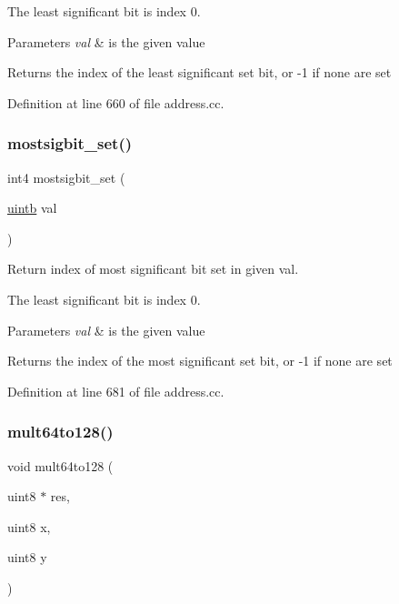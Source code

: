 The least significant bit is index 0. 
\begin{DoxyParams}{Parameters}
{\em val} & is the given value \\
\hline
\end{DoxyParams}
\begin{DoxyReturn}{Returns}
the index of the least significant set bit, or -\/1 if none are set 
\end{DoxyReturn}


Definition at line 660 of file address.\+cc.

\mbox{\label{address_8hh_aa894bdd40ffc8c7a6237e49062c62177}} 
\subsubsection{\texorpdfstring{mostsigbit\_set()}{mostsigbit\_set()}}
{\footnotesize\ttfamily int4 mostsigbit\+\_\+set (\begin{DoxyParamCaption}\item[{\mbox{\hyperlink{types_8h_a2db313c5d32a12b01d26ac9b3bca178f}{uintb}}}]{val }\end{DoxyParamCaption})}



Return index of most significant bit set in given val. 

The least significant bit is index 0. 
\begin{DoxyParams}{Parameters}
{\em val} & is the given value \\
\hline
\end{DoxyParams}
\begin{DoxyReturn}{Returns}
the index of the most significant set bit, or -\/1 if none are set 
\end{DoxyReturn}


Definition at line 681 of file address.\+cc.

\mbox{\label{address_8hh_adc3ee931652193c7dc50b842c3b4a3a6}} 
\subsubsection{\texorpdfstring{mult64to128()}{mult64to128()}}
{\footnotesize\ttfamily void mult64to128 (\begin{DoxyParamCaption}\item[{uint8 $\ast$}]{res,  }\item[{uint8}]{x,  }\item[{uint8}]{y }\end{DoxyParamCaption})}



